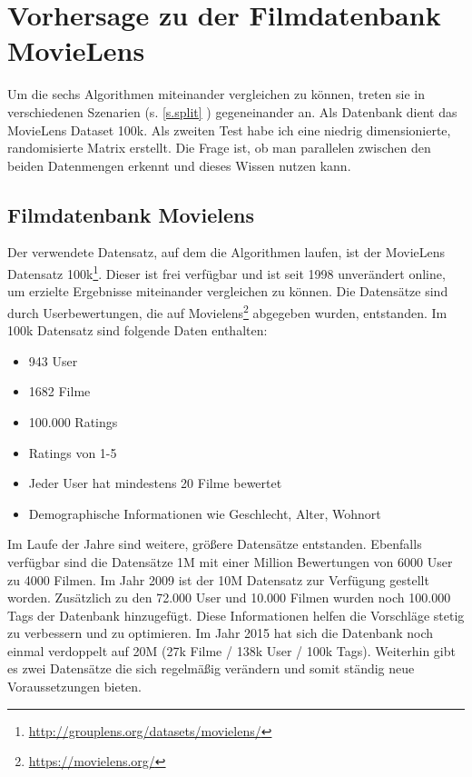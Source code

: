 \section{Vorhersage zu der Filmdatenbank MovieLens}\label{s.Test} \raggedbottom
Um die sechs Algorithmen miteinander vergleichen zu können, treten sie in verschiedenen Szenarien (s.  \autoref{s.split} ) gegeneinander an. Als Datenbank dient das MovieLens Dataset 100k. Als zweiten Test habe ich eine niedrig dimensionierte, randomisierte Matrix erstellt. Die Frage ist, ob man parallelen zwischen den beiden Datenmengen erkennt und dieses Wissen nutzen kann.

\subsection{Filmdatenbank Movielens}\label{s.Datenmenge}
Der verwendete Datensatz, auf dem die Algorithmen laufen, ist der MovieLens Datensatz 100k\footnote{\url{http://grouplens.org/datasets/movielens/}}. Dieser ist frei verfügbar und ist seit 1998 unverändert online, um erzielte Ergebnisse miteinander vergleichen zu können. Die Datensätze sind durch Userbewertungen, die auf Movielens\footnote{\url{https://movielens.org/}} abgegeben wurden, entstanden.
Im 100k Datensatz sind folgende Daten enthalten:
\begin{itemize}
	\item 943 User
	\item 1682 Filme
	\item 100.000 Ratings
	\item Ratings von 1-5
	\item Jeder User hat mindestens 20 Filme bewertet
	\item Demographische Informationen wie Geschlecht, Alter, Wohnort
\end{itemize}
Im Laufe der Jahre sind weitere, größere Datensätze entstanden. 
Ebenfalls verfügbar sind die Datensätze 1M mit einer Million Bewertungen von 6000 User zu 4000 Filmen. Im Jahr 2009 ist der 10M Datensatz zur Verfügung gestellt worden. Zusätzlich zu den 72.000 User und 10.000 Filmen wurden noch 100.000 Tags der Datenbank hinzugefügt. Diese Informationen helfen die Vorschläge stetig zu verbessern und zu optimieren. Im Jahr 2015 hat sich die Datenbank noch einmal verdoppelt auf 20M (27k Filme / 138k User / 100k Tags). Weiterhin gibt es zwei Datensätze die sich regelmäßig verändern und somit ständig neue Voraussetzungen bieten.


